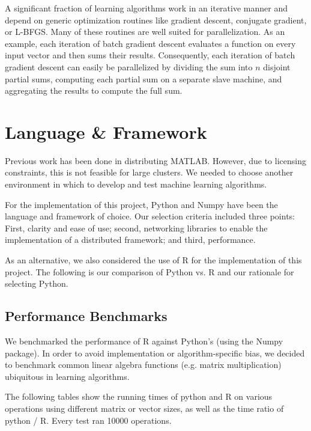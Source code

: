 \documentclass[%
        final,
        notitlepage,
        narroweqnarray,
        inline,
        ]{ieee}
\begin{document}
A significant fraction of learning algorithms work in an iterative manner and
depend on generic optimization routines like gradient descent, conjugate
gradient, or L-BFGS. Many of these routines are well suited for parallelization.
As an example, each iteration of batch gradient descent evaluates a function on
every input vector and then sums their results. Consequently, each iteration of
batch gradient descent can easily be parallelized by dividing the sum into $n$
disjoint partial sums, computing each partial sum on a separate slave machine,
and aggregating the results to compute the full sum.

\section{Language \& Framework}

Previous work has been done in distributing MATLAB. However, due to licensing
constraints, this is not feasible for large clusters. We needed to choose
another environment in which to develop and test machine learning
algorithms.

For the implementation of this project, Python and Numpy have been the language
and framework of choice. Our selection criteria included three points: First,
clarity and ease of use; second, networking libraries to enable the
implementation of a distributed framework; and third, performance.

As an alternative, we also considered the use of R for the implementation of
this project. The following is our comparison of Python vs. R and our rationale
for selecting Python.


\subsection{Performance Benchmarks}

We benchmarked the performance of R against Python's (using the Numpy package).
In order to avoid implementation or algorithm-specific bias, we decided to
benchmark common linear algebra functions (e.g. matrix multiplication)
ubiquitous in learning algorithms.

The following tables show the running times of python and R on various
operations using different matrix or vector sizes, as well as the time ratio of
python / R. Every test ran 10000 operations.
\end{document}
